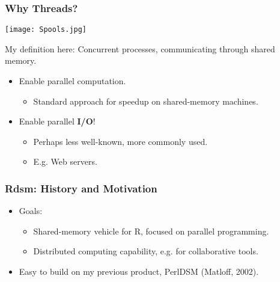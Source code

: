 \documentclass{beamer}
\begin{document}
\begin{frame}
\frametitle{Why Threads?}

\texttt{[image: Spools.jpg]}

My definition here: Concurrent processes, communicating through shared
memory.
\pause

\begin{itemize}

\item Enable parallel computation.
\pause

   \begin{itemize}

   \item Standard approach for speedup on shared-memory machines.
   \pause

   \end{itemize}

\item Enable parallel {\bf I/O}!
\pause

   \begin{itemize}
    
   \item Perhaps less well-known, more commonly used.
   \pause

   \item E.g. Web servers.
   \end{itemize}

\end{itemize}

\end{frame}

\begin{frame}
\frametitle{Rdsm:  History and Motivation}
\pause

\begin{itemize}

\item Goals:
\pause

   \begin{itemize}

   \item Shared-memory vehicle for R, focused on parallel programming.
   \pause

   \item Distributed computing capability, e.g. for collaborative tools.
   \pause

   \end{itemize}

\item Easy to build on my previous product, PerlDSM (Matloff, 2002).

\end{itemize}

\end{frame}
\end{document}
